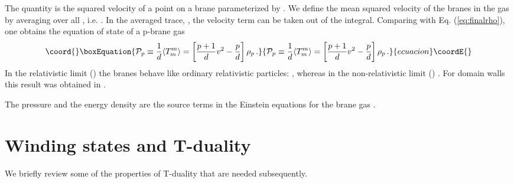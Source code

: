 \documentclass[a4paper,twocolumn,nofootinbib,tightenlines,prd,aps,
               superscriptaddress]{revtex4} %
\providecommand{\si}{\sigma}
\providecommand{\cP}{{\cal{P}}}
\begin{document}
The quantity \coordHE{} is the squared velocity of a
point on a brane parameterized by \myHighlight{$(t,\si^i)$}\coordHE{}. We define the mean
squared velocity of the branes in the gas by averaging over all
\myHighlight{$\si^i$}\coordHE{}, i.e. \coordHE{}.
In the averaged trace, \coordHE{}, the velocity term
can be taken out of the integral. Comparing with Eq.
(\ref{eq:finalrho}), one obtains the equation of state of a
p-brane gas
\begin{equation}\coord{}\boxEquation{
    \cP_p \equiv \frac{1}{d}\langle T^m_m \rangle = \left[\frac{p+1}{d}v^2
    -\frac{p}{d}\right]\rho_p\,.
}{
    \cP_p \equiv \frac{1}{d}\langle T^m_m \rangle = \left[\frac{p+1}{d}v^2
    -\frac{p}{d}\right]\rho_p\,.
}{ecuacion}\coordE{}\end{equation}
In the relativistic limit (\coordHE{}) the branes behave
like ordinary relativistic particles: \myHighlight{$\cP_p = \frac{1}{d}\rho_p$}\coordHE{},
whereas in the non-relativistic limit (\coordHE{}) \myHighlight{$\cP_p
= -\frac{p}{d}\rho_p$}\coordHE{}. For domain walls this result was obtained
in \cite{Zeldovich:1974uw}.

The pressure \myHighlight{$\cP_p$}\coordHE{} and the energy density \coordHE{} are the
source terms in the Einstein equations for the brane gas
\cite{Alexander:2000xv,Tseytlin:1992xk}.




\section{Winding states and T-duality}
\label{sec:tduality}

We briefly review some of the properties
of T-duality that are needed subsequently.
\end{document}
